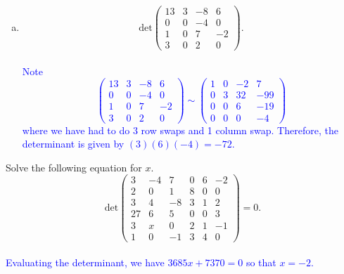 \documentclass[a4paper,11pt]{article}
\newcommand{\BB}[1]{\textcolor{blue}{#1}}
\begin{document}
\begin{enumerate}[(a)]
\item
  \[
    \text{det}
    \left(
      \begin{array}{rrrr}
        13 & 3 & -8 & 6 \\
        0 & 0 & -4 & 0 \\
        1 & 0 & 7 & -2 \\
        3 & 0 & 2 & 0
      \end{array}
    \right).
  \] \\

  \BB{Note
    \[
      \left(
        \begin{array}{rrrr}
          13 & 3 & -8 & 6 \\
          0 & 0 & -4 & 0 \\
          1 & 0 & 7 & -2 \\
          3 & 0 & 2 & 0
        \end{array}
      \right)
      \sim
      \left(
        \begin{array}{rrrr}
          1 & 0 & -2 & 7 \\
          0 & 3 & 32 & -99 \\
          0 & 0 & 6 & -19 \\
          0 & 0 & 0 & -4
        \end{array}
      \right)     
    \]
    where we have had to do 3 row swaps and 1 column swap. Therefore, the
    determinant is given by $(3)(6)(-4)=-72$. \\}
\end{enumerate}

 Solve the following equation for $x$.
\[
  \text{det}
  \left(
    \begin{array}{rrrrrr}
      3 & -4 & 7 & 0 & 6 & -2 \\
      2 & 0 & 1 & 8 & 0 & 0 \\
      3 & 4 & -8 & 3 & 1 & 2 \\
      27 & 6 & 5 & 0 & 0 & 3 \\
      3 & x & 0 & 2 & 1 & -1 \\
      1 & 0 & -1 & 3 & 4 & 0
    \end{array}
  \right)=0.
\] \\

\BB{Evaluating the determinant, we have $3685x+7370=0$ so that $x=-2$. \\}
\end{document}
